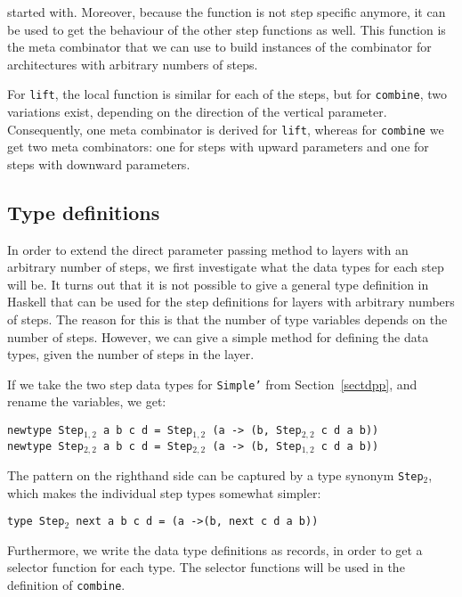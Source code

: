       started with. Moreover, because the function is not step specific anymore, it
      can be used to get the behaviour of the other step functions as well. This
      function is the meta combinator that we can use to build instances of the
      combinator for architectures with arbitrary numbers of steps.
\par  For \texttt{lift}, the local function is similar for each of the steps,
      but for \texttt{combine}, two variations exist, depending on the direction of
      the vertical parameter. Consequently, one meta combinator is derived for
      \texttt{lift}, whereas for \texttt{combine} we get two meta combinators: one
      for steps with upward parameters and one for steps with downward
      parameters.
\subsection{Type definitions}
\label{subsecttypedef}
\par In order to extend the direct parameter passing method to layers with
        an arbitrary number of steps, we first investigate what the data types for each
        step will be. It turns out that it is not possible to give a general type
        definition in Haskell that can be used for the step definitions for layers with
        arbitrary numbers of steps. The reason for this is that the number of type
        variables depends on the number of steps. However, we can give a simple method
        for defining the data types, given the number of steps in the layer.
\par If we take the two step data types for \texttt{Simple'} from
        Section~\ref{sectdpp}, and rename the variables, we get:\par
{\tt newtype Step$_{1,2}$ a b c d = Step$_{1,2}$ (a -> (b, Step$_{2,2}$ c d a b))}\\
{\tt newtype Step$_{2,2}$ a b c d = Step$_{2,2}$ (a -> (b, Step$_{1,2}$ c d a b))}
\par The pattern on the righthand side can be captured by a type synonym
        \texttt{Step$_2$}, which makes the individual step types somewhat simpler:\par
{\tt type Step$_2$ next a b c d = (a ->(b, next c d a b))}
\par Furthermore, we write the data type definitions as records, in order
        to get a selector function for each type. The selector functions will be used
        in the definition of \texttt{combine}.\par
